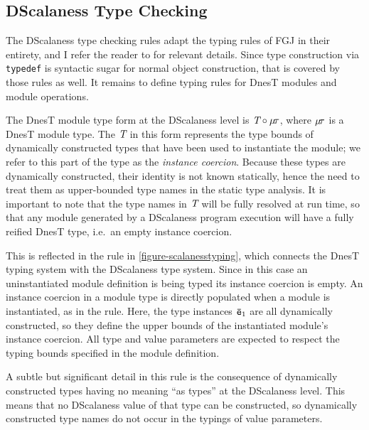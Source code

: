 \subsection{DScalaness Type Checking}
\label{section-scalaness-typing}

\scalanesstypingfig

The DScalaness type checking rules adapt the typing rules of FGJ in their entirety, and I refer
the reader to \cite{FJ} for relevant details. Since type construction via \texttt{typedef} is
syntactic sugar for normal object construction, that is covered by those rules as well. It
remains to define typing rules for DnesT modules and module operations.

The DnesT module type form at the DScalaness level is $\textit{T} \circ \mu\!\tau$, where
$\mu\!\tau$ is a DnesT module type. The $\textit{T}$ in this form represents the type bounds of
dynamically constructed types that have been used to instantiate the module; we refer to this
part of the type as the \emph{instance coercion}. Because these types are dynamically
constructed, their identity is not known statically, hence the need to treat them as
upper-bounded type names in the static type analysis. It is important to note that the type
names in $\textit{T}$ will be fully resolved at run time, so that any module generated by a
DScalaness program execution will have a fully reified DnesT type, i.e.~an empty instance
coercion.

This is reflected in the  rule in \autoref{figure-scalanesstyping}, which connects
the DnesT typing system with the DScalaness type system. Since in this case an uninstantiated
module definition is being typed its instance coercion is empty. An instance coercion in a
module type is directly populated when a module is instantiated, as in the 
rule. Here, the type instances ${\mathtt{\bar{e}}}_1$ are all dynamically constructed, so they define the
upper bounds of the instantiated module's instance coercion. All type and value parameters are
expected to respect the typing bounds specified in the module definition.

A subtle but significant detail in this rule is the consequence of dynamically constructed types
having no meaning ``as types'' at the DScalaness level. This means that no DScalaness value of
that type can be constructed, so dynamically constructed type names do not occur in the typings
of value parameters. 

